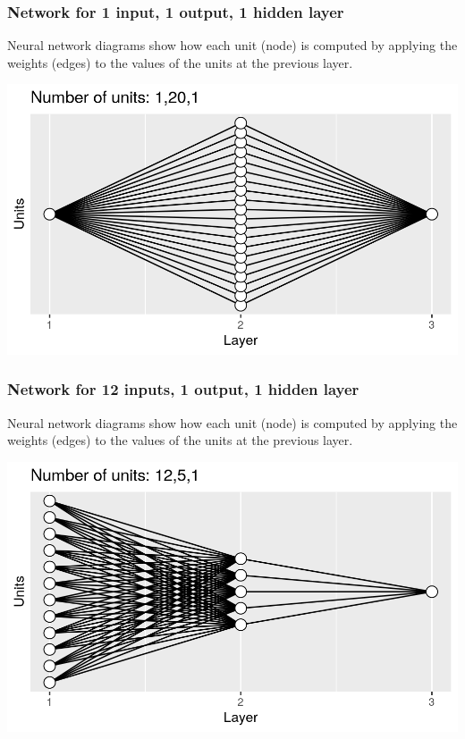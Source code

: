 \documentclass{beamer}
\begin{document}
\begin{frame}
  \frametitle{Network for 1 input, 1 output, 1 hidden layer}
  Neural network
  diagrams show how each unit (node) is computed by applying the
  weights (edges) to the values of the units at the previous layer.

\includegraphics[width=\textwidth]{figure-architecture-reg20}
\end{frame}

\begin{frame}
  \frametitle{Network for 12 inputs, 1 output, 1 hidden layer}
  Neural network
  diagrams show how each unit (node) is computed by applying the
  weights (edges) to the values of the units at the previous layer.

\includegraphics[width=\textwidth]{figure-architecture-oneOut}
\end{frame}
\end{document}
